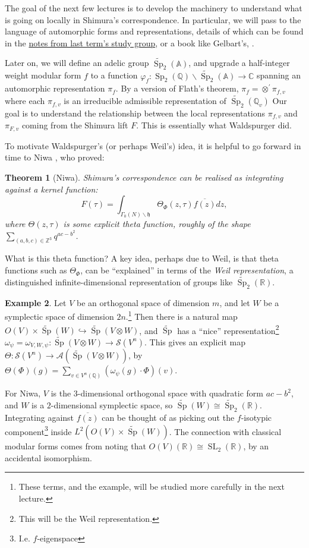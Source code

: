 \documentclass[11pt,a4paper,leqno]{article}
\let\mscr\mathscr
\let\mc\mathcal
\let\mf\mathfrak
\newcommand{\A}{\mathbb{A}}
\newcommand{\1}{\mathbbm{1}}
\newcommand{\Z}{\mathbb{Z}}
\newcommand{\Q}{\mathbb{Q}}
\newcommand{\R}{\mathbb{R}}
\newcommand{\C}{\mathbb{C}}
\renewcommand{\phi}{\varphi}
\DeclareMathOperator{\SL}{SL}
\DeclareMathOperator{\Sp}{Sp}
\newcommand{\SpC}{\widetilde{\operatorname{\Sp}}}
\theoremstyle{plain}
\newtheorem{theorem}{Theorem}[section]
\theoremstyle{definition}
\newtheorem{example}[theorem]{Example}
\theoremstyle{remark}
\numberwithin{equation}{section}
\begin{document}
The goal of the next few lectures is to develop the machinery to
understand what is going on locally in Shimura's correspondence. In
particular, we will pass to the language of automorphic forms and
representations, details of which can be found in the
\href{https://users.ox.ac.uk/~quee4127/automorphic/autom.html}{notes
  from last term's study group}, or a book like Gelbart's, \cite{gelbart1973}.

Later on, we will define an adelic group $\SpC_{2}(\A)$, and
upgrade a half-integer weight modular form $f$ to a function
$\phi_{f}\colon\Sp_{2}(\Q) \backslash \SpC_{2}(\A) \to \C$ spanning an automorphic
representation $\pi_{f}$. By a version of Flath's
theorem, $\pi_{f} = \otimes^{'}\pi_{f,v}$ where each $\pi_{f,v}$ is an irreducible
admissible representation of $\SpC_{2}(\Q_{v})$ Our goal is to understand the
relationship between the local representations $\pi_{f,v}$ and $\pi_{F,v}$
coming from the Shimura lift $F$. This is essentially what Waldspurger
did.

To motivate Waldspurger's (or perhaps Weil's) idea, it is helpful to go forward in time to Niwa
\cite{niwa1975}, who proved:
\begin{theorem}[Niwa]
  Shimura's correspondence can be realised as integrating against a
  kernel function:
  \begin{equation}
    \label{eq:9}
    F(\tau) = \int_{\Gamma_{0}(N)\backslash \mf h} \Theta_{\Phi}(z,\tau)\overline{f(z)}dz,
  \end{equation}
where $\Theta(z,\tau)$ is some explicit theta function, roughly of the shape
$\sum_{(a,b,c)\in \Z^{3}} q^{ac-b^{2}}$.
\end{theorem}
What is this theta function? A key idea, perhaps due to Weil, is that
theta functions such as $\Theta_{\Phi}$, can be ``explained'' in terms of the
\emph{Weil representation}, a distinguished infinite-dimensional
representation of groups like $\SpC_{2}(\R)$.

\begin{example}
  Let $V$ be an orthogonal space of dimension $m$, and let $W$ be a
  symplectic space of dimension $2n$.\footnote{These terms, and the
    example, will be studied more carefully in the next lecture.} Then
  there is a natural map
  $O(V)\times \SpC(W) \hookrightarrow\SpC(V \otimes W)$, and $\SpC$ has a ``nice''
  representation\footnote{This will be the Weil representation.}
  $\omega_{\psi} = \omega_{V,W,\psi} \colon \SpC(V \otimes W) \to \mc S(V^{n})$. This gives an
  explicit map
  $\Theta \colon \mc S(V^{n}) \to \mscr A(\SpC(V\otimes W))$, by
  $\Theta(\Phi)(g) = \sum_{v \in V^{n}(\Q)}(\omega_{\psi}(g)\cdot \Phi)(v)$.

  For Niwa, $V$ is the $3$-dimensional orthogonal space with quadratic
  form $ac -b^{2}$, and $W$ is a $2$-dimensional symplectic space, so 
  $\SpC(W) \cong \SpC_{2}(\R)$. Integrating against $\overline{f(z)}$ can
  be thought of as picking out the $f$-isotypic
  component\footnote{I.e. $f$-eigenspace} inside $L^{2}(O(V)\times
  \SpC(W))$. The connection with classical modular forms comes from
  noting that $O(V)(\R) \cong \SL_{2}(\R)$, by an accidental isomorphism.
\end{example}
\end{document}
